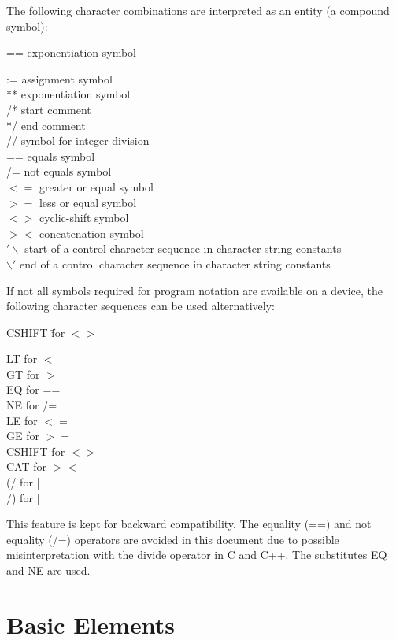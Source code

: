 The following character combinations are interpreted as an entity (a
compound symbol):

\begin{tabbing}
== \= exponentiation symbol \kill

:=    \> assignment symbol\\ \relax
**    \> exponentiation symbol\\
/*    \> start comment\\ \relax
*/    \> end comment\\
//    \> symbol for integer division\\
==    \> equals symbol\\
/=    \> not equals symbol\\
$<=$  \> greater or equal symbol\\
$>=$  \> less or equal symbol\\
$<>$  \> cyclic-shift symbol\\
$><$  \> concatenation symbol\\
$'\backslash$ \> start of a control character sequence in character string constants\\
$\backslash'$ \> end of a control character sequence in character string constants
\end{tabbing}

If not all symbols required for program notation are available on a
device, the following character sequences can be used alternatively:

\begin{tabbing}
CSHIFT \= for $<>$ \kill

LT     \> for $<$\\
GT     \> for $>$\\
EQ     \> for ==\\
NE     \> for /=\\
LE     \> for $<=$\\
GE     \> for $>=$\\
CSHIFT \> for $<>$\\
CAT    \> for $><$\\
(/     \> for $[$\\
/)     \> for $]$\\
\end{tabbing}
This feature is kept for backward compatibility.
The equality (==) and not equality (/=) operators are avoided
in this document due to possible misinterpretation 
with the divide operator in C and C++. The substitutes EQ and NE are 
used.

\section{Basic Elements}    %

